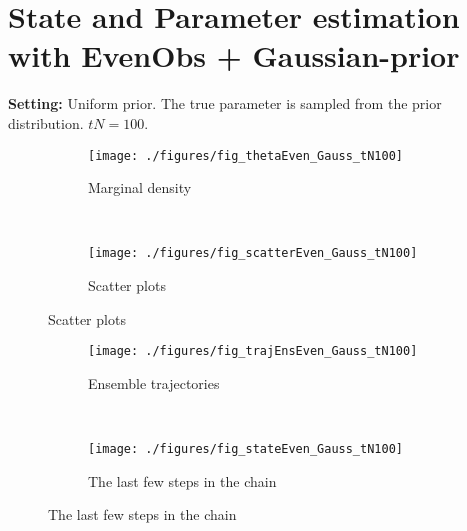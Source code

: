 \documentclass[12pt]{article}
\begin{document}
\section{State and Parameter estimation with EvenObs + Gaussian-prior}
{\bf Setting:} Uniform prior. The true parameter is sampled from the prior distribution. $tN=100$. 
\begin{figure}[h!]
   \caption{Parameter estimation}\label{fig:traj} \vspace{-2mm}
    \centering
    \hspace{-20mm}
    \begin{subfigure}[b]{0.45\textwidth}        \caption{Marginal density}\vspace{-2mm}
        \texttt{[image: ./figures/fig\_thetaEven\_Gauss\_tN100]} %
        \label{fig:gull}
    \end{subfigure}
    ~ %
    \begin{subfigure}[b]{0.45\textwidth}          \caption{Scatter plots}\vspace{-2mm}
        \texttt{[image: ./figures/fig\_scatterEven\_Gauss\_tN100]} %
        \label{fig:tiger}
    \end{subfigure}
\end{figure}
\begin{figure}[h!]
  \caption{State estimation} \label{fig:traj} \vspace{-4mm}
    \centering
    \hspace{-20mm}
    \begin{subfigure}[b]{0.45\textwidth}
        \texttt{[image: ./figures/fig\_trajEnsEven\_Gauss\_tN100]}
        \caption{Ensemble trajectories}
        \label{fig:gull}
    \end{subfigure}
    ~ %
    \begin{subfigure}[b]{0.45\textwidth}
        \texttt{[image: ./figures/fig\_stateEven\_Gauss\_tN100]}
          \caption{The last few steps in the chain}
        \label{fig:tiger}
    \end{subfigure}
\end{figure}
\end{document}
